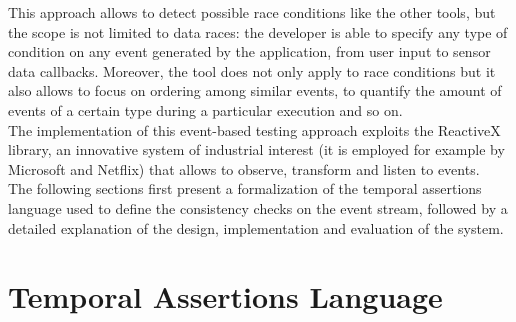 \documentclass[11pt,a4paper,notitlepage]{article}
\begin{document}
This approach allows to detect possible race conditions like the other tools, but the scope is not limited to data races: the developer is able to specify any type of condition on any event generated by the application, from user input to sensor data callbacks. Moreover, the tool does not only apply to race conditions but it also allows to focus on ordering among similar events, to quantify the amount of events of a certain type during a particular execution and so on.\medskip \\
The implementation of this event-based testing approach exploits the ReactiveX library, an innovative system of industrial interest (it is employed for example by Microsoft and Netflix) that allows to observe, transform and listen to events.\medskip \\
The following sections first present a formalization of the temporal assertions language used to define the consistency checks on the event stream, followed by a detailed explanation of the design, implementation and evaluation of the system.

\section{Temporal Assertions Language}
\end{document}
